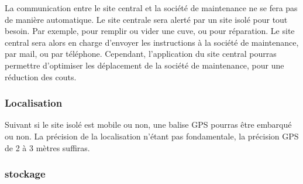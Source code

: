             La communication entre le site central et la société de maintenance ne se fera pas de manière automatique.
            Le site centrale sera alerté par un site isolé pour tout besoin. Par exemple, pour remplir ou vider une cuve, ou pour réparation.
            Le site central sera alors en charge d'envoyer les instructions à la société de maintenance, par mail, ou par téléphone.
            Cependant, l'application du site central pourras permettre d'optimiser les déplacement de la société de maintenance, pour une réduction des couts.
            
        \subsubsection{Localisation}
        
            Suivant si le site isolé est mobile ou non, une balise GPS pourras être embarqué ou non.
            La précision de la localisation n'étant pas fondamentale, la précision GPS de 2 à 3 mètres suffiras.
            
        \subsubsection{stockage}
        
